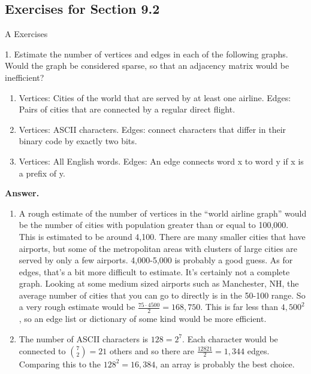 \documentclass[10pt,]{book}
\theoremstyle{plain}
\theoremstyle{definition}
\theoremstyle{definition}
\theoremstyle{definition}
\theoremstyle{definition}
\theoremstyle{definition}
\numberwithin{equation}{section}
\begin{document}
\subsection[Exercises for Section 9.2]{Exercises for Section 9.2}\label{exercises-9-2}
\hypertarget{exercisegroup-2}{}\typeout{************************************************}
\typeout{************************************************}
A Exercises%
\begin{exercisegroup}
\item[1.]\hypertarget{exercise-12}{}Estimate the number of vertices and edges in each of the following graphs. Would the graph be considered sparse, so that an adjacency matrix would be inefficient?%
\par
\leavevmode%
\begin{enumerate}[label=\alph*]
\item\hypertarget{li-26}{} Vertices: Cities of the world that are served by at least one airline. 
  Edges: Pairs of cities that are connected by a regular direct flight.%
\item\hypertarget{li-27}{} Vertices: ASCII characters. 
 Edges: connect characters that differ in their binary code by exactly two bits.%
\item\hypertarget{li-28}{} Vertices: All English words. 
 Edges: An edge connects word x to word y if x is a prefix of y.%
\end{enumerate}
%
\par\smallskip
\par\smallskip
\noindent\textbf{Answer.}\hypertarget{answer-1}{}\quad
\leavevmode%
\begin{enumerate}[label=\alph*]
\item\hypertarget{li-29}{}  A rough estimate of the number of vertices in the ``world airline graph'' would be the number of cities with population greater than or equal to 100,000. This is estimated to be around 4,100. There are many smaller cities that have airports, but some of the metropolitan areas with clusters of large cities are served by only a few airports.  4,000-5,000 is probably a good guess.   As for edges, that's a bit more difficult to estimate.  It's certainly not  a complete graph.  Looking at some medium sized airports such as Manchester, NH, the average number of cities that you can go to directly is in the 50-100 range.   So a very
rough estimate would be   \(\frac{75 \cdot  4500}{2}=168,750\). This is far less than \(4,500^2\), so an edge list or dictionary of some kind would be more efficient. %
\item\hypertarget{li-30}{} The number of ASCII characters is \(128 = 2^7\).  Each character would be connected to \(\binom{7}{2}=21\) others and so there are \(\frac{128 \dot 21}{2}=1,344\)  edges.  Comparing this to the \(128^2=16,384\), an array is probably the best choice.

\end{enumerate}
\end{exercisegroup}
\end{document}
